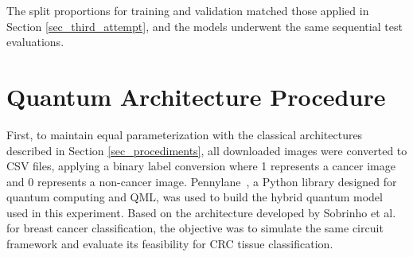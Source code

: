 The split proportions for training and validation matched those applied in Section \ref{sec_third_attempt}, and the models underwent the same sequential test evaluations.

\section{Quantum Architecture Procedure}
\label{sec_quantum_first}
First, to maintain equal parameterization with the classical architectures described in Section \ref{sec_procediments}, all downloaded images were converted to \gls{CSV} files, applying a binary label conversion where 1 represents a cancer image and 0 represents a non-cancer image.
Pennylane~\cite{Bergholm_2018}, a Python library designed for quantum computing and \gls{QML}, was used to build the hybrid quantum model used in this experiment. Based on the architecture developed by Sobrinho et al. \cite{quanvolution} for breast cancer classification, the objective was to simulate the same circuit framework and evaluate its feasibility for \gls{CRC} tissue classification. 

